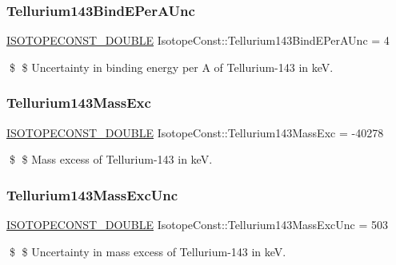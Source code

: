 \subsubsection{\texorpdfstring{Tellurium143\+Bind\+E\+Per\+A\+Unc}{Tellurium143BindEPerAUnc}}
{\footnotesize\ttfamily \mbox{\hyperlink{group___isotope_const-_macros_ga8f45a7272ce02c0b4c65c44636ed719a}{I\+S\+O\+T\+O\+P\+E\+C\+O\+N\+S\+T\+\_\+\+D\+O\+U\+B\+LE}} Isotope\+Const\+::\+Tellurium143\+Bind\+E\+Per\+A\+Unc = 4}

\$ \$ Uncertainty in binding energy per A of Tellurium-\/143 in keV. \mbox{\label{group___isotope_const-_tellurium-_te143_gad96fb70d42b9d9d9e624e1611a4993e9}} 
\subsubsection{\texorpdfstring{Tellurium143\+Mass\+Exc}{Tellurium143MassExc}}
{\footnotesize\ttfamily \mbox{\hyperlink{group___isotope_const-_macros_ga8f45a7272ce02c0b4c65c44636ed719a}{I\+S\+O\+T\+O\+P\+E\+C\+O\+N\+S\+T\+\_\+\+D\+O\+U\+B\+LE}} Isotope\+Const\+::\+Tellurium143\+Mass\+Exc = -\/40278}

\$ \$ Mass excess of Tellurium-\/143 in keV. \mbox{\label{group___isotope_const-_tellurium-_te143_ga83d027075d538cbe3081bcff3b2adea4}} 
\subsubsection{\texorpdfstring{Tellurium143\+Mass\+Exc\+Unc}{Tellurium143MassExcUnc}}
{\footnotesize\ttfamily \mbox{\hyperlink{group___isotope_const-_macros_ga8f45a7272ce02c0b4c65c44636ed719a}{I\+S\+O\+T\+O\+P\+E\+C\+O\+N\+S\+T\+\_\+\+D\+O\+U\+B\+LE}} Isotope\+Const\+::\+Tellurium143\+Mass\+Exc\+Unc = 503}

\$ \$ Uncertainty in mass excess of Tellurium-\/143 in keV. \mbox{\label{group___isotope_const-_tellurium-_te143_gafe8ad60ea77015ab1e0894facbaba9d2}} 
